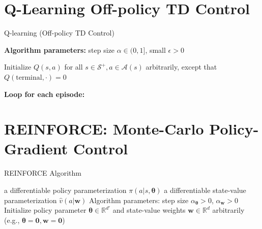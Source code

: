 \documentclass[../xlapes02]{subfiles}
\begin{document}
    \section{Q-Learning Off-policy TD Control}\label{sec:q-learning-off-policy-td-control}
    \begin{algorithm}[h!]
        \caption{Q-learning (Off-policy TD Control)}
        \label{alg:q_learning}

        \textbf{Algorithm parameters:} step size $\alpha \in (0, 1]$, small $\epsilon > 0$

        Initialize $Q(s, a)$ for all $s \in \mathcal{S}^+, a \in \mathcal{A}(s)$ arbitrarily, except that $Q(\text{terminal}, \cdot) = 0$

        \textbf{Loop for each episode:}
    \end{algorithm}


    \section{REINFORCE: Monte-Carlo Policy-Gradient Control}\label{sec:reinforce:-monte-carlo-policy-gradient-control}
    \begin{algorithm}[h!]
        \caption{REINFORCE Algorithm}
        \label{alg:REINFORCE}

        a differentiable policy parameterization $\pi(a|s, \bm{\theta})$\;
        a differentiable state-value parameterization $\hat{v}(a|\bm{w})$\;
        Algorithm parameters: step size $\alpha_{\bm{\theta}} > 0$, $\alpha_{\bm{w}} > 0$\;
        Initialize policy parameter $\bm{\theta} \in \mathbb{R}^{d'}$ and state-value weights $\bm{w} \in \mathbb{R}^{d}$ arbitrarily (e.g., $\bm{\theta} = \bm{0}, \bm{w} = \bm{0}$)\;

    \end{algorithm}
\end{document}
